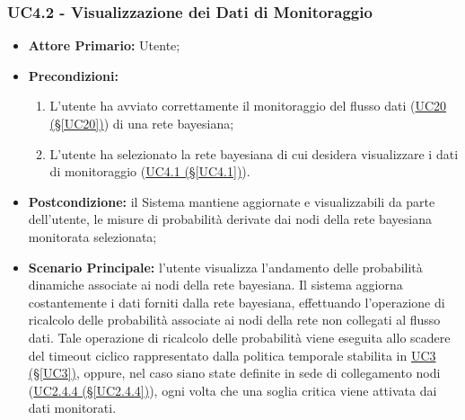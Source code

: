 \subsubsection{UC4.2 - Visualizzazione dei Dati di Monitoraggio}\label{UC4.2}

\begin{itemize}
	\item \textbf{Attore Primario:} Utente;
	\item \textbf{Precondizioni:}
	\begin{enumerate}
 		\item L'utente ha avviato correttamente il monitoraggio del flusso dati (\hyperref[UC20]{UC20 (§\ref*{UC20})}) di una rete bayesiana;
 		\item L'utente ha selezionato la rete bayesiana di cui desidera visualizzare i dati di monitoraggio (\hyperref[UC4.1]{UC4.1 (§\ref*{UC4.1})}).
	\end{enumerate}
	\item \textbf{Postcondizione:} il Sistema mantiene aggiornate e visualizzabili da parte dell'utente, le misure di probabilità derivate dai nodi della rete bayesiana monitorata selezionata;
	\item \textbf{Scenario Principale:} l'utente visualizza l'andamento delle probabilità dinamiche associate ai nodi della rete bayesiana. Il sistema aggiorna costantemente i dati forniti dalla rete bayesiana, effettuando l'operazione di ricalcolo delle probabilità associate ai nodi della rete non collegati al flusso dati. Tale operazione di ricalcolo delle probabilità viene eseguita allo scadere del timeout ciclico rappresentato dalla politica temporale stabilita in \hyperref[UC3]{UC3 (§\ref*{UC3})}, oppure, nel caso siano state definite in sede di collegamento nodi (\hyperref[UC2.4.4]{UC2.4.4 (§\ref*{UC2.4.4})}), ogni volta che una soglia critica viene attivata dai dati monitorati.
\end{itemize}

\pagebreak

